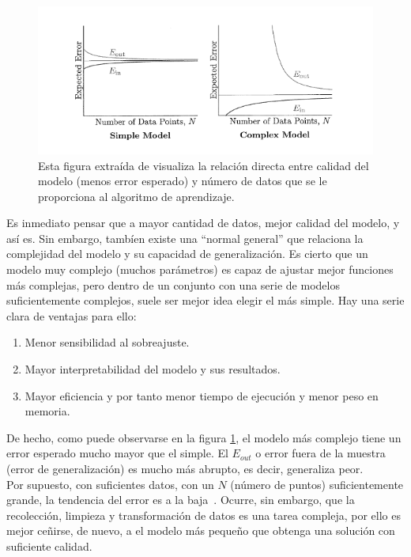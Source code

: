 \begin{figure}[H]
    \begin{center}
        \includegraphics[width=1\textwidth]{imagenes/learning_from_data_vc.png}
    \end{center}
    \caption[Correlación entre error del modelo y N]{Esta figura extraída de \cite{Mostafa2012} visualiza la relación directa entre calidad del modelo (menos error esperado) y número de datos que se le proporciona al algoritmo de aprendizaje.}
    \label{fig:learning_from_data_vc}
\end{figure}

Es inmediato pensar que a mayor cantidad de datos, mejor calidad del modelo, y así es. Sin embargo, tambíen existe una ``normal general'' que relaciona la complejidad del modelo y su capacidad de generalización. Es cierto que un modelo muy complejo (muchos parámetros) es capaz de ajustar mejor funciones más complejas, pero dentro de un conjunto con una serie de modelos suficientemente complejos, suele ser mejor idea elegir el más simple. Hay una serie clara de ventajas para ello:
\begin{enumerate}
    \item Menor  sensibilidad al sobreajuste.
    \item Mayor interpretabilidad del modelo y sus resultados.
    \item Mayor eficiencia y por tanto menor tiempo de ejecución y menor peso en memoria.
\end{enumerate}

De hecho, como puede observarse en la figura \ref{fig:learning_from_data_vc}, el modelo más complejo tiene un error esperado mucho mayor que el simple. El $E_{out}$ o error fuera de la muestra (error de generalización) es mucho más abrupto, es decir, generaliza peor.\\[6pt]
Por supuesto, con suficientes datos, con un $N$ (número de puntos) suficientemente grande, la tendencia del error es a la baja~\cite{Mostafa2012, shalev2014understanding}. Ocurre, sin embargo, que la recolección, limpieza y transformación de datos es una tarea compleja, por ello es mejor ceñirse, de nuevo, a el modelo más pequeño que obtenga una solución con suficiente calidad.\\[6pt]

